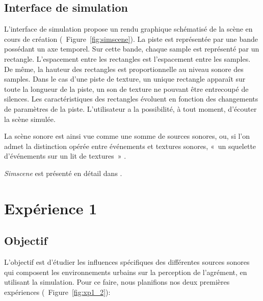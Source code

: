 \documentclass[twoside,twocolumn]{article}
\begin{document}
\subsection{Interface de simulation}

L'interface de simulation propose un rendu graphique schématisé de la scène en cours de création (\cf~Figure~\ref{fig:simscene}). La piste est représentée par une bande possédant un axe temporel. Sur cette bande, chaque sample est représenté par un rectangle. L'espacement entre les rectangles est   l'espacement entre les samples. De même, la hauteur des rectangles est proportionnelle au niveau sonore des samples. Dans le cas d'une piste de texture, un unique rectangle apparaît sur toute la longueur de la piste, un son de texture ne pouvant être entrecoupé de silences. Les caractéristiques des rectangles évoluent en fonction des changements de paramètres de la piste. L'utilisateur a la possibilité, à tout moment, d'écouter la scène simulée. 

La scène sonore est ainsi vue comme une somme de sources sonores, ou, si l'on admet la distinction opérée entre événements et textures sonores, «~un squelette d'événements sur un lit de textures~» \cite{nelken2013ear}. 

\emph{Simscene} est présenté en détail dans \cite{rossignol2015simscene}.


\section{Expérience 1}
\label{sec:xp1}

\subsection{Objectif}

L'objectif est d'étudier les influences spécifiques des différentes sources sonores qui composent les environnements urbains sur la perception de l'agrément, en utilisant la simulation. Pour ce faire, nous planifions nos deux premières expériences (\cf~Figure~\ref{fig:xp1_2}):
\end{document}
